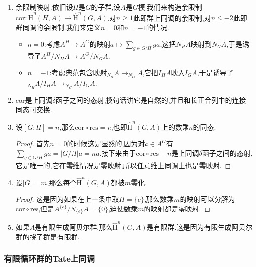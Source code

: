 \begin{enumerate}
\begin{proof}
		任取$x\in _{N_G}C$,它在$_{N_G}C/I_GC$中的像记作$\overline{x}$,那么$\delta{\overline{x}}$是这样得到的:先把$c$提升到$b\in B$,再取$N_G(b)$在$A^G/N_GA$中的像,它在$A^G/N_HA$中的像就是$\mathrm{res}(\delta(\overline{x}))$.另一方面,$\mathrm{res}(\overline{x})$可以表示为$\sum_{i\in I}s_ix$,其中$s_i$是$G/H$右陪集的代表元集,那么$\delta(\mathrm{res}(\overline{x}))$就是$N_H(\sum_is_ib)$在$A^H/N_HA$中的像,也就是$\mathrm{N}_G(b)$在$A^H/N_HA$中的像.
	\end{proof}
	\item 余限制映射.依旧设$H$是$G$的子群,设$A$是$G$模,我们来构造余限制$\mathrm{cor}:\widehat{\mathrm{H}}^n(H,A)\to\widehat{\mathrm{H}}^n(G,A)$.对$n\ge1$此即群上同调的余限制,对$n\le-2$此即群同调的余限制.我们来定义$n=0$和$n=-1$的情况.
	\begin{itemize}
		\item $n=0$:考虑$A^H\to A^G$的映射$a\mapsto\sum_{\overline{g}\in G/H}ga$,这把$N_HA$映射到$N_GA$,于是诱导了$A^H/N_HA\to A^G/N_GA$.
		\item $n=-1$:考虑典范包含映射$_{N_H}A\to_{N_G}A$,它把$I_HA$映入$I_GA$,于是诱导了$_{N_H}A/I_HA\to _{N_G}A/I_GA$.
	\end{itemize}
	\item $\mathrm{cor}$是上同调$\delta$函子之间的态射,换句话讲它是自然的,并且和长正合列中的连接同态可交换.
	\item 设$[G:H]=n$,那么$\mathrm{cor}\circ\mathrm{res}=n$,也即$\widehat{\mathrm{H}}^n(G,A)$上的数乘$n$的同态.
	\begin{proof}
		
		首先$n=0$的时候这是显然的,因为对$a\in A^G$有$\sum_{\overline{g}\in G/H}ga=|G/H|a=na$.接下来由于$\mathrm{cor}\circ\mathrm{res}-n$是上同调$\delta$函子之间的态射,它是唯一的,它在零维情况是零映射,所以任意维上同调上也是零映射.
	\end{proof}
	\item 设$|G|=m$,那么每个$\widehat{\mathrm{H}}^n(G,A)$都被$m$零化.
	\begin{proof}
		
		这是因为如果在上一条中取$H=\{e\}$,那么数乘$m$的映射可以分解为$\mathrm{cor}\circ\mathrm{res}$,但是$A^{\{e\}}/N_{\{e\}}A=\{0\}$,迫使数乘$m$的映射都是零映射.
	\end{proof}
	\item 如果$A$是有限生成阿贝尔群,那么$\widehat{\mathrm{H}}^n(G,A)$是有限群.这是因为有限生成阿贝尔群的挠子群是有限群.
\end{enumerate}
\subsubsection{有限循环群的Tate上同调}

